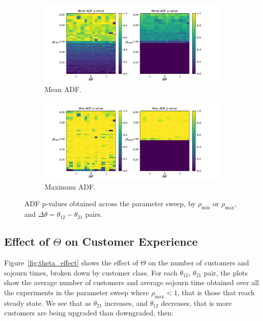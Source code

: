\documentclass{article}
\begin{document}
\begin{figure}[!htbp]
  \begin{center}
  \begin{subfigure}[b]{\textwidth}
    \includegraphics[width=\textwidth]{img/mean_adf.pdf}
    \caption{Mean ADF.}
  \end{subfigure}
  \begin{subfigure}[b]{\textwidth}
    \includegraphics[width=\textwidth]{img/max_adf.pdf}
    \caption{Maximum ADF.}
  \end{subfigure}
  \end{center}
  \caption{ADF p-values obtained across the parameter sweep, by
  $\rho_{\text{min}}$ or $\rho_{\text{max}}$, and
  $\Delta\theta = \theta_{12} - \theta_{21}$ pairs.}
  \label{fig:adf_parametersweep}
\end{figure}


\subsection{Effect of $\Theta$ on Customer Experience}
Figure~\ref{fig:theta_effect} shows the effect of $\Theta$ on the number of
customers and sojourn times, broken down by customer class. For each
$\theta_{12}$, $\theta_{21}$ pair, the plots show the average number of
customers and average sojourn time obtained over all the experiments in the
parameter sweep where $\rho_{\max} < 1$, that is those that reach steady state.
We see that as $\theta_{21}$ increases, and $\theta_{12}$ decreases, that is
more customers are being upgraded than downgraded, then:
\end{document}
